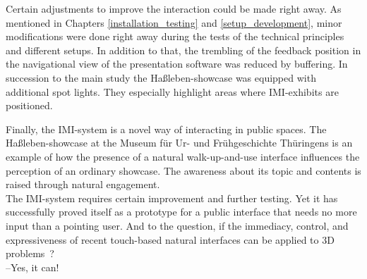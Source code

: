 Certain adjustments to improve the interaction could be made right away. As mentioned in Chapters \ref{installation_testing} and \ref{setup_development}, minor modifications were done right away during the tests of the technical principles and different setups. In addition to that, the trembling of the feedback position in the navigational view of the presentation software was reduced by buffering. In succession to the main study the Haßleben-showcase was equipped with additional spot lights. They especially highlight areas where \ac{IMI}-exhibits are positioned.   

Finally, the \ac{IMI}-system is a novel way of interacting in public spaces. The Haßleben-showcase at the Museum für Ur- und Frühgeschichte Thüringens is an example of how the presence of a natural walk-up-and-use interface influences the perception of an ordinary showcase. The awareness about its topic and contents is raised through natural engagement. 
\\
The \ac{IMI}-system requires certain improvement and further testing. Yet it has successfully proved itself as a prototype for a public interface that needs no more input than a pointing user. And to the question, if the immediacy, control, and expressiveness of recent touch-based natural interfaces can be applied to 3D problems~\cite{ForewordCnG}?\\
--Yes, it can!

%
